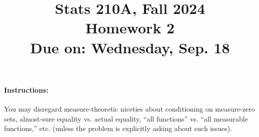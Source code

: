 \documentclass{article}
\theoremstyle{definition}
\begin{document}
\title{Stats 210A, Fall 2024\\
  Homework 2 \\
  {\large {\bf Due on}: Wednesday, Sep. 18}}
\date{}

\maketitle

\paragraph{Instructions:} You may disregard measure-theoretic niceties about conditioning on measure-zero sets, almost-sure equality vs. actual equality, ``all functions'' vs. ``all measurable functions,'' etc. (unless the problem is explicitly asking about such issues).
\end{document}

